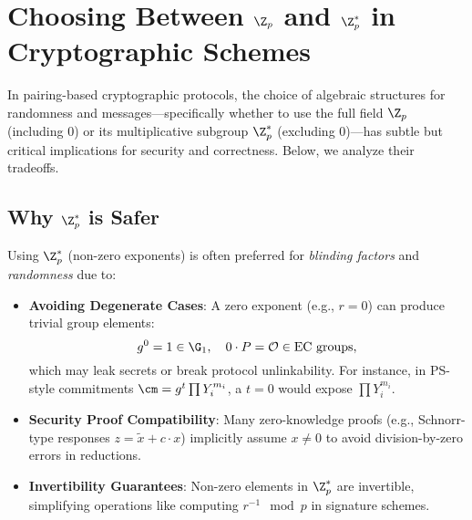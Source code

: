 \section{Choosing Between $\Z_p$ and $\Z_p^*$ in Cryptographic Schemes}
\label{sec:zp-vs-zpstar}

In pairing-based cryptographic protocols, the choice of algebraic structures for randomness and messages—specifically whether to use the full field $\Z_p$ (including 0) or its multiplicative subgroup $\Z_p^*$ (excluding 0)—has subtle but critical implications for security and correctness. Below, we analyze their tradeoffs.

\subsection{Why $\Z_p^*$ is Safer}
Using $\Z_p^*$ (non-zero exponents) is often preferred for \textit{blinding factors} and \textit{randomness} due to:
\begin{itemize}
    \item \textbf{Avoiding Degenerate Cases}: 
        A zero exponent (e.g., $r = 0$) can produce trivial group elements:
        \[
        g^0 = 1 \in \G_1, \quad 0 \cdot P = \mathcal{O} \in \text{EC groups},
        \]
        which may leak secrets or break protocol unlinkability. For instance, in PS-style commitments $\cm = g^t \prod Y_i^{m_i}$, a $t = 0$ would expose $\prod Y_i^{m_i}$.
    
    \item \textbf{Security Proof Compatibility}: 
        Many zero-knowledge proofs (e.g., Schnorr-type responses $z = \tilde{x} + c \cdot x$) implicitly assume $x \neq 0$ to avoid division-by-zero errors in reductions.
    
    \item \textbf{Invertibility Guarantees}: 
        Non-zero elements in $\Z_p^*$ are invertible, simplifying operations like computing $r^{-1} \mod p$ in signature schemes.
\end{itemize}

